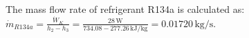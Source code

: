 The mass flow rate of refrigerant R134a is calculated as:  
\( \dot{m}_{R134a} = \frac{\dot{W}_K}{h_2 - h_3} = \frac{28 \, \text{W}}{734.08 - 277.26 \, \text{kJ/kg}} = 0.01720 \, \text{kg/s} \).